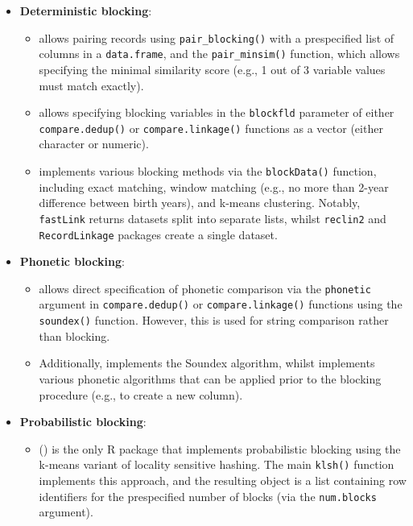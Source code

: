\begin{itemize}
\tightlist
\item
  \textbf{Deterministic blocking}:

  \begin{itemize}
  \tightlist
  \item
     \citep[\citet{reclin2-rjournal}]{reclin2} allows pairing
    records using \texttt{pair\_blocking()} with a prespecified list of
    columns in a \texttt{data.frame}, and the \texttt{pair\_minsim()} function,
    which allows specifying the minimal similarity score (e.g., 1
    out of 3 variable values must match exactly).
  \item
     \citep[
    \citet{RecordLinkage-rjournal}]{RecordLinkage} allows specifying blocking variables in
    the \texttt{blockfld} parameter of either \texttt{compare.dedup()} or
    \texttt{compare.linkage()} functions as a vector (either character or
    numeric).
  \item
     \citep[\citet{enamorado2019using}]{fastLink} implements
    various blocking methods via the \texttt{blockData()} function,
    including exact matching, window matching (e.g., no more than
    2-year difference between birth years), and k-means clustering.
    Notably, \texttt{fastLink} returns datasets split into separate lists,
    whilst \texttt{reclin2} and \texttt{RecordLinkage} packages create a single
    dataset.
  \end{itemize}
\item
  \textbf{Phonetic blocking}:

  \begin{itemize}
  \tightlist
  \item
     allows direct specification of phonetic
    comparison via the \texttt{phonetic} argument in \texttt{compare.dedup()} or
    \texttt{compare.linkage()} functions using the \texttt{soundex()} function.
    However, this is used for string comparison rather than
    blocking.
  \item
    Additionally,  \citep{stringdist} implements the
    Soundex algorithm, whilst  \citep[
    \citet{Phonetic2020}]{phonics} implements various phonetic algorithms that can
    be applied prior to the blocking procedure (e.g., to create a
    new column).
  \end{itemize}
\item
  \textbf{Probabilistic blocking}:

  \begin{itemize}
  \tightlist
  \item
     (\citet{klsh}) is the only R package that implements
    probabilistic blocking using the k-means variant of locality
    sensitive hashing. The main \texttt{klsh()} function implements this
    approach, and the resulting object is a list containing row
    identifiers for the prespecified number of blocks (via the
    \texttt{num.blocks} argument).
  \end{itemize}
\end{itemize}

